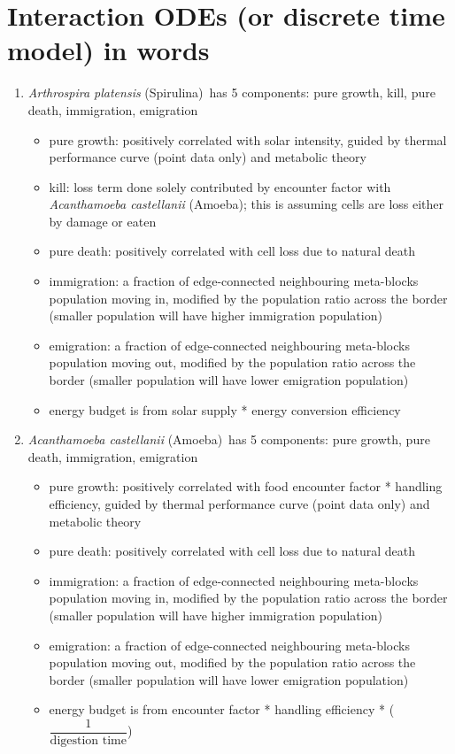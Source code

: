 \documentclass[a4paper,11pt]{article}
\newcommand{\am}{\textit{Acanthamoeba castellanii} (Amoeba)}
\newcommand{\ap}{\textit{Arthrospira platensis} (Spirulina)}
\begin{document}
    \section{Interaction ODEs (or discrete time model) in words}
    \begin{enumerate}
        \item \ap\ has 5 components: pure growth, kill, pure death, immigration, emigration
        \begin{itemize}
            \item pure growth: positively correlated with solar intensity, guided by thermal performance curve (point data only) and metabolic theory\autocite{schramski2015metabolic}
            \item kill: loss term done solely contributed by encounter factor with \am; this is assuming cells are loss either by damage or eaten
            \item pure death: positively correlated with cell loss due to natural death
            \item immigration: a fraction of edge-connected neighbouring meta-blocks population moving in, modified by the population ratio across the border (smaller population will have higher immigration population)
            \item emigration: a fraction of edge-connected neighbouring meta-blocks population moving out, modified by the population ratio across the border (smaller population will have lower emigration population)
            \item energy budget is from solar supply * energy conversion efficiency\autocite{usharani2012spirulina}
        \end{itemize}
        
        \item \am\ has 5 components: pure growth, pure death, immigration, emigration
        \begin{itemize}
            \item pure growth: positively correlated with food encounter factor * handling efficiency\autocite{wright1981acanthamoeba}, guided by thermal performance curve (point data only) and metabolic theory\autocite{schramski2015metabolic}
            \item pure death: positively correlated with cell loss due to natural death
            \item immigration: a fraction of edge-connected neighbouring meta-blocks population moving in, modified by the population ratio across the border (smaller population will have higher immigration population)
            \item emigration: a fraction of edge-connected neighbouring meta-blocks population moving out, modified by the population ratio across the border (smaller population will have lower emigration population)
            \item energy budget is from encounter factor * handling efficiency\autocite{wright1981acanthamoeba} * ($\dfrac{1}{\text{digestion time}}$)\autocite{wright1981acanthamoeba}
        \end{itemize}
        

\end{enumerate}
\end{document}
